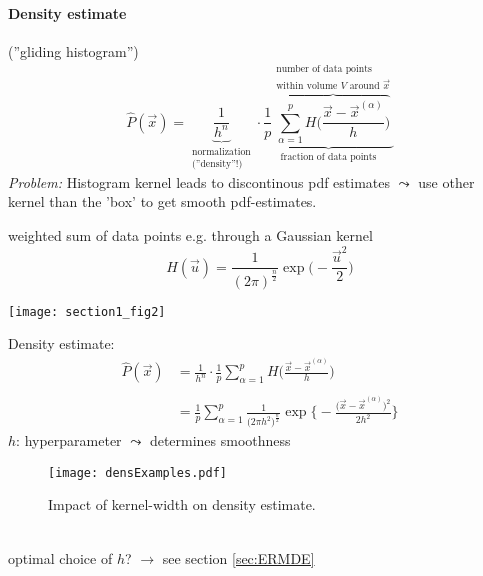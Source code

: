 \paragraph{Density estimate} (''gliding histogram'')
\begin{equation}
	\widehat{P}(\vec{x}) = \underbrace{ \frac{1}{h^n} }_{
					\substack{ \text{normalization} \\
						\text{(''density''!)}}}
				\cdot \underbrace{ \frac{1}{p} 
				\overbrace{ \sum\limits_{\alpha = 1}^p
				H \bigg( \frac{\vec{x} - \vec{x}^{(\alpha)}}{
						h} \bigg) }^{
					\substack{\text{number of data points}\\
						\text{within volume } V 
						\text{ around } \vec{x}}} }_{
					\text{fraction of data points}}
\end{equation}
\emph{Problem:} Histogram kernel leads to discontinous pdf estimates $\leadsto$ use other kernel than the 'box' to get smooth pdf-estimates. 
\begin{itemize}
	\itl weighted sum of data points
	\itl e.g. through a Gaussian kernel \\
		\begin{equation}
			H(\vec{u}) = \frac{1}{(2\pi)^{\frac{n}{2}}} 
				\exp \bigg( -\frac{\vec{u}^2}{2} \bigg)
		\end{equation}
\end{itemize}
\begin{center}\texttt{[image: section1\_fig2]}
\end{center}
Density estimate:
\begin{equation}
	\begin{array}{ll}
	\widehat{P}(\vec{x}) 
	& = \frac{1}{h^n} \cdot \frac{1}{p} \sum\limits_{\alpha = 1}^p
		H \Big( \frac{\vec{x} - \vec{x}^{(\alpha)}}{h} \Big) \\\\
	& = \frac{1}{p} \sum\limits_{\alpha = 1}^p \frac{1}{
				\big(2\pi h^2\big)^{\frac{n}{2}}}
			\exp \bigg\{ -\frac{\big(\vec{x} - \vec{x}^{(\alpha)}
						\big)^2}{2h^2} \bigg\}
	\end{array}
\end{equation}
$h$: hyperparameter $\leadsto$ determines smoothness
\\
\begin{figure}[h]
  \centering
  \texttt{[image: densExamples.pdf]}
  \caption{Impact of kernel-width on density estimate.}
  \label{fig:kernelWidth}
\end{figure}
\\
optimal choice of $h$? $\rightarrow$ see section \ref{sec:ERMDE}


